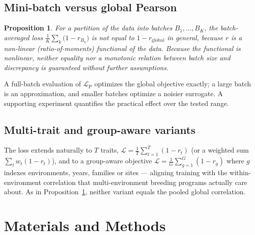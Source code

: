 \documentclass[11pt]{article}
\theoremstyle{plain}
\newtheorem{proposition}{Proposition}
\theoremstyle{remark}
\begin{document}
\subsection{Mini-batch versus global Pearson}\label{sec:prop3}
\begin{proposition}\label{prop:3}
For a partition of the data into batches $B_1,\dots,B_K$, the batch-averaged loss
$\tfrac1K\sum_k \bigl(1-r_{B_k}\bigr)$ is not equal to $1-r_{\mathrm{global}}$ in
general, because $r$ is a non-linear (ratio-of-moments) functional of the data.
Because the functional is nonlinear, neither equality nor a monotonic relation
between batch size and discrepancy is guaranteed without further assumptions.
\end{proposition}
A full-batch evaluation of $\mathcal{L}_{\mathrm{P}}$ optimizes the global
objective exactly; a large batch is an approximation, and smaller batches
optimize a noisier surrogate. A supporting experiment quantifies the practical
effect over the tested range.

\subsection{Multi-trait and group-aware variants}\label{sec:groupaware}
The loss extends naturally to $T$ traits, $\mathcal{L}=\tfrac1T\sum_{t=1}^T
(1-r_t)$ (or a weighted sum $\sum_t w_t(1-r_t)$), and to a group-aware objective
$\mathcal{L}=\tfrac1G\sum_{g=1}^G (1-r_g)$ where $g$ indexes environments, years,
families or sites --- aligning training with the within-environment correlation
that multi-environment breeding programs actually care about. As in
Proposition~\ref{prop:3}, neither variant equals the pooled global correlation.

\section{Materials and Methods}\label{sec:methods}
\end{document}
